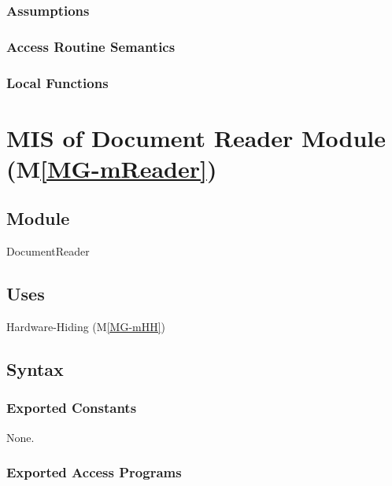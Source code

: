 \documentclass[12pt, titlepage]{article}
\newcommand{\mref}[1]{M\ref{MG-#1}}
\begin{document}

\subsubsection{Assumptions}

\subsubsection{Access Routine Semantics}

\subsubsection{Local Functions}

\newpage


\section{MIS of Document Reader Module (\mref{mReader})} \label{mis-mReader}

\subsection{Module}

DocumentReader

\subsection{Uses}

Hardware-Hiding (\mref{mHH})

\subsection{Syntax}

\subsubsection{Exported Constants}

None.

\subsubsection{Exported Access Programs}
\end{document}
